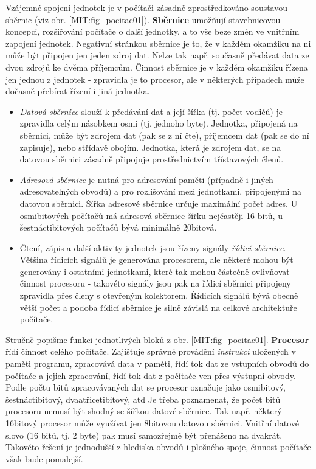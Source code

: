     Vzájemné spojení jednotek je v počítači zásadně zprostředkováno soustavou sběrnic (viz obr. 
    \ref{MIT:fig_pocitac01}). \textbf{Sběrnice} umožňují stavebnicovou koncepci, rozšiřování 
    počítače o další jednotky, a to vše beze změn ve vnitřním zapojení jednotek. Negativní stránkou 
    sběrnice je to, že v každém okamžiku na ni může být připojen jen jeden zdroj dat. Nelze tak 
    např. současně předávat data ze dvou zdrojů ke dvěma příjemcům. Činnost sběrnice je v každém 
    okamžiku řízena jen jednou z jednotek - zpravidla je to procesor, ale v některých případech 
    může dočasně přebírat řízení i jiná jednotka. 
    \begin{itemize}\addtolength{\itemsep}{-0.5\baselineskip}
      \item \emph{Datová sběrnice} slouží k předávání dat a její šířka (tj. počet vodičů) je 
            zpravidla celým násobkem osmi (tj. jednoho byte). Jednotka, připojená na sběrnici, může 
            být zdrojem dat (pak se z ní čte), příjemcem dat (pak se do ní zapisuje), nebo střídavě 
            obojím. Jednotka, která je zdrojem dat, se na datovou sběrnici zásadně připojuje 
            prostřednictvím třístavových členů.
      
      \item \emph{Adresová sběrnice} je nutná pro adresování paměti (případně i jiných 
            adresovatelných obvodů) a pro rozlišování mezi jednotkami, připojenými na datovou 
            sběrnici. Šířka adresové sběrnice určuje maximální počet adres. U osmibitových počítačů 
            má adresová sběrnice šířku nejčastěji 16 bitů, u šestnáctibitových počítačů bývá 
            minimálně 20bitová.
      
      \item Čtení, zápis a další aktivity jednotek jsou řízeny signály \emph{řídicí sběrnice}. 
            Většina řídicích signálů je generována procesorem, ale některé mohou být generovány i 
            ostatními jednotkami, které tak mohou částečně ovlivňovat činnost procesoru - takovéto 
            signály jsou pak na řídicí sběrnici připojeny zpravidla přes členy s otevřeným 
            kolektorem. Řídicích signálů bývá obecně větší počet a podoba řídicí sběrnice je silně 
            závislá na celkové architektuře počítače.
    \end{itemize}
    
    Stručně popišme funkci jednotlivých bloků z obr. \ref{MIT:fig_pocitac01}. \textbf{Procesor} 
    řídí činnost celého počítače. Zajišťuje správné provádění \emph{instrukcí} uložených v paměti 
    programu, zpracovává data v paměti, řídí tok dat ze vstupních obvodů do počítače a jejich 
    zpracování, řídí tok dat z počítače ven přes výstupní obvody. Podle počtu bitů zpracovávaných 
    dat se procesor označuje jako osmibitový, šestnáctibitový, dvaatřicetibitový, atd Je třeba 
    poznamenat, že počet bitů procesoru nemusí být shodný se šířkou datové sběrnice. Tak např. 
    některý 16bitový procesor může využívat jen 8bitovou datovou sběrnici. Vnitřní datové slovo (16 
    bitů, tj. 2 byte) pak musí samozřejmě být přenášeno na dvakrát. Takovéto řešení je jednodušší z 
    hlediska obvodů i plošného spoje, činnost počítače však bude pomalejší.
    
